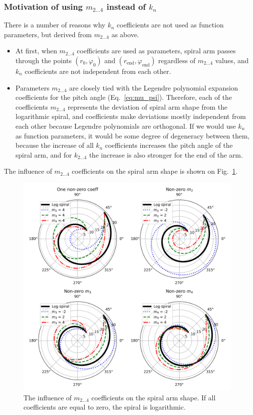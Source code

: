 \documentclass[12pt,a4paper]{article}
\begin{document}
\subsubsection{Motivation of using $m_{2 \ldots 4}$ instead of $k_n$}
There is a number of reasons why $k_n$ coefficients are not used as function parameters, but derived from $m_{2 \ldots 4}$ as above.
\begin{itemize}
	\item At first, when $m_{2 \ldots 4}$ coefficients are used as parameters, spiral arm passes through the points $(r_0, \varphi_0)$ and $(r_\text{end}, \varphi_\text{end})$ regardless of $m_{2 \ldots 4}$ values, and $k_n$ coefficients are not independent from each other.
	\item Parameters $m_{2 \ldots 4}$ are closely tied with the Legendre polynomial expansion coefficients for the pitch angle (Eq.~\ref{eq:mu_psi}). Therefore, each of the coefficients $m_{2 \ldots 4}$ represents the deviation of spiral arm shape from the logarithmic spiral, and coefficients make deviations mostly independent from each other because Legendre polynomials are orthogonal. If we would use $k_n$ as function parameters, it would be some degree of degeneracy between them, because the increase of all $k_n$ coefficients increases the pitch angle of the spiral arm, and for $k_{2 \ldots 4}$ the increase is also stronger for the end of the arm. 
\end{itemize}

The influence of $m_{2 \ldots 4}$ coefficients on the spiral arm shape is shown on Fig.~\ref{fig:Coeffs}.

\begin{figure}
	\centering
	\includegraphics[width=0.95\linewidth]{"pictures/coeffs_illustration"}
	\caption{The influence of $m_{2 \ldots 4}$ coefficients on the spiral arm shape. If all coefficients are equal to zero, the spiral is logarithmic.}
	\label{fig:Coeffs}
\end{figure}
\end{document}
